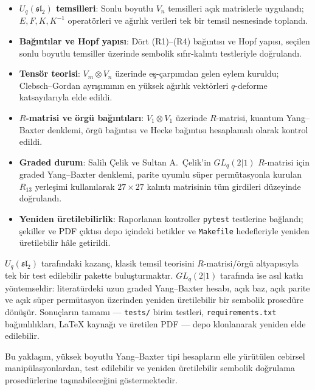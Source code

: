 \documentclass[12pt,a4paper,fleqn]{report}
\newcommand{\normalsemi}{;}
\newcommand{\normalsemi}{\begingroup\semicolonfont;\endgroup}
\numberwithin{equation}{chapter}
\theoremstyle{plain}
\theoremstyle{definition}
\renewcommand{\sl}{\mathfrak{sl}}
\newcommand{\Uq}{U_q(\sl_2)}
\begin{document}
\begin{itemize}[leftmargin=*]
  \item \textbf{$\Uq$ temsilleri}: Sonlu boyutlu $V_n$ temsilleri açık
        matrislerle uygulandı\normalsemi{} $E,F,K,K^{-1}$ operatörleri ve ağırlık verileri
        tek bir temsil nesnesinde toplandı.
  \item \textbf{Bağıntılar ve Hopf yapısı}: Dört (R1)--(R4) bağıntısı ve Hopf
        yapısı, seçilen sonlu boyutlu temsiller üzerinde sembolik
        sıfır-kalıntı testleriyle doğrulandı.
  \item \textbf{Tensör teorisi}: $V_m \otimes V_n$ üzerinde eş-çarpımdan gelen
        eylem kuruldu\normalsemi{} Clebsch--Gordan ayrışımının en yüksek ağırlık vektörleri
        $q$-deforme katsayılarıyla elde edildi.
  \item \textbf{$R$-matrisi ve örgü bağıntıları}: $V_1 \otimes V_1$ üzerinde
        $R$-matrisi, kuantum Yang--Baxter denklemi, örgü bağıntısı ve Hecke
        bağıntısı hesaplamalı olarak kontrol edildi.
  \item \textbf{Graded durum}: Salih Çelik ve Sultan A.\ Çelik'in
        $GL_q(2|1)$ $R$-matrisi için graded Yang--Baxter denklemi, parite
        uyumlu süper permütasyonla kurulan $R_{13}$ yerleşimi kullanılarak
        $27\times 27$ kalıntı matrisinin tüm girdileri düzeyinde doğrulandı.
  \item \textbf{Yeniden üretilebilirlik}: Raporlanan kontroller
        \texttt{pytest} testlerine bağlandı\normalsemi{} şekiller ve PDF çıktısı depo
        içindeki betikler ve \texttt{Makefile} hedefleriyle yeniden üretilebilir
        hâle getirildi.
\end{itemize}

$\Uq$ tarafındaki kazanç, klasik temsil teorisini $R$-matrisi/örgü altyapısıyla
tek bir test edilebilir pakette buluşturmaktır. $GL_q(2|1)$ tarafında ise asıl
katkı yöntemseldir: literatürdeki uzun graded Yang--Baxter hesabı, açık baz,
açık parite ve açık süper permütasyon üzerinden yeniden üretilebilir bir sembolik
prosedüre dönüşür. Sonuçların tamamı --- \texttt{tests/} birim testleri,
\texttt{requirements.txt} bağımlılıkları, LaTeX kaynağı ve üretilen PDF --- depo
klonlanarak yeniden elde edilebilir.

Bu yaklaşım, yüksek boyutlu Yang--Baxter tipi hesapların elle yürütülen
cebirsel manipülasyonlardan, test edilebilir ve yeniden üretilebilir sembolik
doğrulama prosedürlerine taşınabileceğini göstermektedir.
\end{document}
